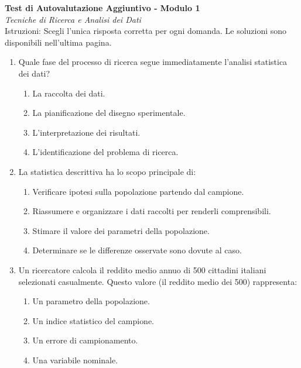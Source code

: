 \documentclass[12pt, a4paper]{article}
\begin{document}
\begin{center}
    \Large\textbf{Test di Autovalutazione Aggiuntivo - Modulo 1} \\
    \vspace{0.2cm}
    \large\textit{Tecniche di Ricerca e Analisi dei Dati} \\
    \vspace{0.5cm}
    \normalsize{Istruzioni: Scegli l'unica risposta corretta per ogni domanda. Le soluzioni sono disponibili nell'ultima pagina.}
\end{center}
\vspace{1cm}

\begin{enumerate} %
    \item Quale fase del processo di ricerca segue immediatamente l'analisi statistica dei dati?
    \begin{enumerate} %
        \item La raccolta dei dati.
        \item La pianificazione del disegno sperimentale.
        \item L'interpretazione dei risultati.
        \item L'identificazione del problema di ricerca.
    \end{enumerate}

    \item La statistica descrittiva ha lo scopo principale di:
    \begin{enumerate}
        \item Verificare ipotesi sulla popolazione partendo dal campione.
        \item Riassumere e organizzare i dati raccolti per renderli comprensibili.
        \item Stimare il valore dei parametri della popolazione.
        \item Determinare se le differenze osservate sono dovute al caso.
    \end{enumerate}

    \item Un ricercatore calcola il reddito medio annuo di 500 cittadini italiani selezionati casualmente. Questo valore (il reddito medio dei 500) rappresenta:
    \begin{enumerate}
        \item Un parametro della popolazione.
        \item Un indice statistico del campione.
        \item Un errore di campionamento.
        \item Una variabile nominale.
    \end{enumerate}


\end{enumerate}
\end{document}
